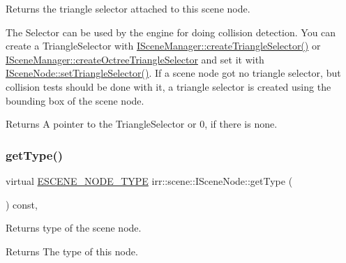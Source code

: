 Returns the triangle selector attached to this scene node. 

The Selector can be used by the engine for doing collision detection. You can create a Triangle\+Selector with \hyperlink{classirr_1_1scene_1_1ISceneManager_a266625379b1558e9be1dc062ea4e71f7}{I\+Scene\+Manager\+::create\+Triangle\+Selector()} or \hyperlink{classirr_1_1scene_1_1ISceneManager_a4ed7d3b34f4d0c70395b6d464fe32b96}{I\+Scene\+Manager\+::create\+Octree\+Triangle\+Selector} and set it with \hyperlink{classirr_1_1scene_1_1ISceneNode_a87fb52ec54bf3ae117340d8defd1255f}{I\+Scene\+Node\+::set\+Triangle\+Selector()}. If a scene node got no triangle selector, but collision tests should be done with it, a triangle selector is created using the bounding box of the scene node. \begin{DoxyReturn}{Returns}
A pointer to the Triangle\+Selector or 0, if there is none. 
\end{DoxyReturn}
\mbox{\label{classirr_1_1scene_1_1ISceneNode_a3468b09e4afa009d2036efbea9c09b8c}} 
\subsubsection{\texorpdfstring{get\+Type()}{getType()}}
{\footnotesize\ttfamily virtual \hyperlink{namespaceirr_1_1scene_acad3d7ef92a9807d391ba29120f3b7bd}{E\+S\+C\+E\+N\+E\+\_\+\+N\+O\+D\+E\+\_\+\+T\+Y\+PE} irr\+::scene\+::\+I\+Scene\+Node\+::get\+Type (\begin{DoxyParamCaption}{ }\end{DoxyParamCaption}) const\hspace{0.3cm}{\ttfamily [inline]}, {\ttfamily [virtual]}}



Returns type of the scene node. 

\begin{DoxyReturn}{Returns}
The type of this node. 
\end{DoxyReturn}
\mbox{\label{classirr_1_1scene_1_1ISceneNode_ad35515d81242e24c8b831bf29a555221}} 
